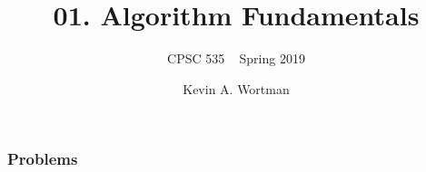 \documentclass{beamer}
\title{01. Algorithm Fundamentals}
\subtitle{CPSC 535 ~ Spring 2019}
\author{Kevin A. Wortman}
\institute{California State University, Fullerton}
\begin{document}
\begin{frame}
  \titlepage
\end{frame}

\begin{frame}
  \frametitle{Problems}

\end{frame}
\end{document}
